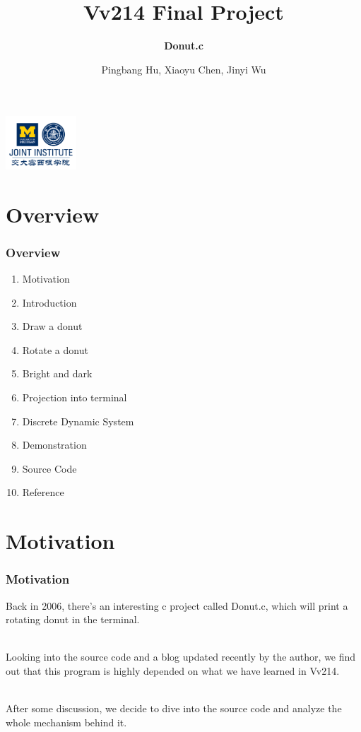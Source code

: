 \documentclass[12pt, t]{beamer}
\title{Vv214 Final Project}
\subtitle{\textbf{Donut.c}}
\institute[UM-SJTU JI]{University of Michigan-Shanghai Jiao Tong University Joint Institute}
\author{Pingbang Hu, Xiaoyu Chen, Jinyi Wu}
\newcommand{\nullspace}{~\\[15pt]}
\begin{document}
\begin{frame}
    \titlepage
    \begin{center}
        \includegraphics[height=2cm]{Figures/logo/logo2.png}
    \end{center}
\end{frame}

\section{Overview}
\begin{frame}
    \frametitle{Overview}
    \begin{enumerate}
        \item Motivation
        \item Introduction
        \item Draw a donut
        \item Rotate a donut
        \item Bright and dark
        \item Projection into terminal
        \item Discrete Dynamic System
        \item Demonstration
        \item Source Code
        \item Reference
    \end{enumerate}
\end{frame}


\section{Motivation}
\begin{frame}
    \frametitle{Motivation}

    Back in 2006, there's an interesting c project called Donut.c, which will print a rotating
    donut in the terminal.

    \nullspace
    Looking into the source code and a blog updated recently by the author, we find out
    that this program is highly depended on what we have learned in Vv214.

    \nullspace
    After some discussion, we decide to dive into the source code and analyze the whole mechanism
    behind it.

\end{frame}
\end{document}

